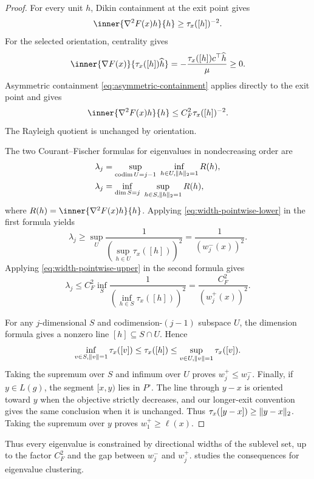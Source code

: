 \begin{proof}
For every unit $h$, Dikin containment at the exit point gives
\begin{equation}
 \inner{\nabla^2F(x)h}{h}\geq\tau_x([h])^{-2}.
 \label{eq:width-pointwise-lower}
\end{equation}
For the selected orientation, centrality gives
\[
 \inner{\nabla F(x)}{\tau_x([h])\widehat h}
 =-\frac{\tau_x([h])c^\top\widehat h}{\mu}\geq0.
\]
Asymmetric containment \eqref{eq:asymmetric-containment} applies directly
to the exit point and gives
\begin{equation}
 \inner{\nabla^2F(x)h}{h}\leq C_F^2\tau_x([h])^{-2}.
 \label{eq:width-pointwise-upper}
\end{equation}
The Rayleigh quotient is unchanged by orientation.

The two Courant--Fischer formulas for eigenvalues in nondecreasing order are
\begin{align*}
 \lambda_j&=\sup_{\operatorname{codim}U=j-1}
             \ \inf_{h\in U,\lVert h\rVert_2=1}R(h),\\
 \lambda_j&=\inf_{\dim S=j}
             \ \sup_{h\in S,\lVert h\rVert_2=1}R(h),
\end{align*}
where $R(h)=\inner{\nabla^2F(x)h}{h}$.  Applying
\eqref{eq:width-pointwise-lower} in the first formula yields
\[
 \lambda_j\geq
 \sup_U\frac1{(\sup_{h\in U}\tau_x([h]))^2}
 =\frac1{(w_j^-(x))^2}.
\]
Applying \eqref{eq:width-pointwise-upper} in the second formula gives
\[
 \lambda_j\leq C_F^2
 \inf_S\frac1{(\inf_{h\in S}\tau_x([h]))^2}
 =\frac{C_F^2}{(w_j^+(x))^2}.
\]

For any $j$-dimensional $S$ and codimension-$(j-1)$ subspace $U$, the
dimension formula gives a nonzero line $[h]\subseteq S\cap U$.  Hence
\[
 \inf_{v\in S,\lVert v\rVert=1}\tau_x([v])
 \leq\tau_x([h])
 \leq\sup_{v\in U,\lVert v\rVert=1}\tau_x([v]).
\]
Taking the supremum over $S$ and infimum over $U$ proves
$w_j^+\leq w_j^-$.  Finally, if $y\in L(g)$, the segment $[x,y)$ lies in
$P^\circ$.  The line through $y-x$ is oriented toward $y$ when the objective
strictly decreases, and our longer-exit convention gives the same conclusion
when it is unchanged.  Thus
$\tau_x([y-x])\geq\lVert y-x\rVert_2$.  Taking the supremum over $y$ proves
$w_1^+\geq\ell(x)$.
\end{proof}

Thus every eigenvalue is constrained by directional widths of the sublevel
set, up to the factor $C_F^2$ and the gap between $w_j^-$ and $w_j^+$.
 studies the consequences for eigenvalue clustering.

